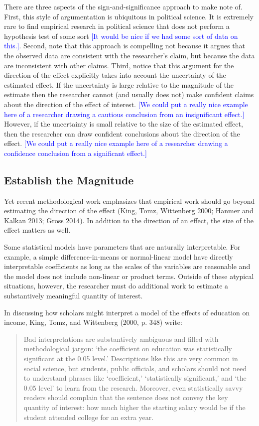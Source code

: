 \documentclass[12pt]{article}
\newcommand{\kelly}[1]{\textcolor{blue}{#1}}
\begin{document}
There are three aspects of the sign-and-significance approach to make note of. First, this style of argumentation is ubiquitous in political science. It is extremely rare to find empirical research in political science that does not perform a hypothesis test of some sort \kelly{[It would be nice if we had some sort of data on this.]}. Second, note that this approach is compelling not because it argues that the observed data are consistent with the researcher's claim, but because the data are inconsistent with other claims. Third, notice that this argument for the direction of the effect explicitly takes into account the uncertainty of the estimated effect. If the uncertainty is large relative to the magnitude of the estimate then the researcher cannot (and usually does not) make confident claims about the direction of the effect of interest. \kelly{[We could put a really nice example here of a researcher drawing a cautious conclusion from an insignificant effect.]} However, if the uncertainty is small relative to the size of the estimated effect, then the researcher can draw confident conclusions about the direction of the effect. \kelly{[We could put a really nice example here of a researcher drawing a confidence conclusion from a significant effect.]}

\subsection*{Establish the Magnitude}

Yet recent methodological work emphasizes that empirical work should go beyond estimating the direction of the effect (King, Tomz, Wittenberg 2000; Hanmer and Kalkan 2013; Gross 2014). In addition to the direction of an effect, the size of the effect matters as well. 

Some statistical models have parameters that are naturally interpretable. For example, a simple difference-in-means or normal-linear model have directly interpretable coefficients as long as the scales of the variables are reasonable and the model does not include non-linear or product terms. Outside of these atypical situations, however, the researcher must do additional work to estimate a substantively meaningful quantity of interest.

In discussing how scholars might interpret a model of the effects of education on income, King, Tomz, and Wittenberg (2000, p. 348) write:

\begin{quote}
Bad interpretations are substantively ambiguous and filled with methodological jargon: `the coefficient on education was statistically significant at the 0.05 level.' Descriptions like this are very common in social science, but students, public officials, and scholars should not need to understand phrases like `coefficient,' `statistically significant,' and `the 0.05 level' to learn from the research. Moreover, even statistically savvy readers should complain that the sentence does not convey the key quantity of interest: how much higher the starting salary would be if the student attended college for an extra year.
\end{quote}
\end{document}
